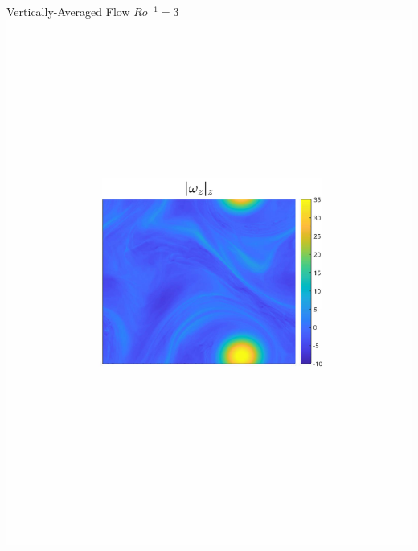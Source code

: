 \documentclass{beamer}
\begin{document}
\begin{frame}{Vertically-Averaged Flow}
        {\footnotesize $Ro^{-1} = 3$}
    \emp
        \centering
        \includegraphics[width=1\textwidth]{images/Om3B30_vortz_bar.pdf}
    \emp
        \centering

\end{frame}
\end{document}
